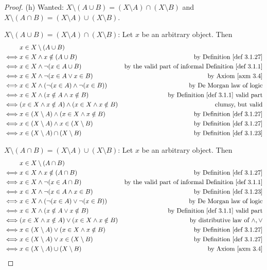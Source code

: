 \begin{proof}{(h)} Wanted: \(X \setminus (A \cup B) = (X \setminus A) \cap (X \setminus B) \) and \(X \setminus (A \cap B) = (X \setminus A) \cup (X \setminus B)\).

\(X \setminus (A \cup B) = (X \setminus A) \cap (X \setminus B) \): Let \(x\) be an arbitrary object. Then
\begin{align*}
         & x \in X \setminus (A \cup B) \\
    \iff & x \in X \land x \notin (A \cup B) & \text{by \DEF{3.1.27}} \\
    \iff & x \in X \land \lnot(x \in A \cup B) & \text{by the valid part of informal \DEF{3.1.1}} \\
    \iff & x \in X \land \lnot(x \in A \lor x \in B) & \text{by \AXM{3.4}} \\
    \iff & x \in X \land (\lnot(x \in A) \land \lnot(x \in B)) & \text{by De Morgan law of logic} \\
    \iff & x \in X \land (x \notin A \land x \notin B) & \text{by \DEF{3.1.1} valid part} \\
    \iff & (x \in X \land x \notin A) \land (x \in X \land x \notin B) & \text{clumsy, but valid} \\
    \iff & x \in (X \setminus A) \land (x \in X \land x \notin B) & \text{by \DEF{3.1.27}} \\
    \iff & x \in (X \setminus A) \land x \in (X \setminus B) & \text{by \DEF{3.1.27}} \\
    \iff & x \in (X \setminus A) \cap (X \setminus B) & \text{by \DEF{3.1.23}}
\end{align*}

\(X \setminus (A \cap B) = (X \setminus A) \cup (X \setminus B) \): Let \(x\) be an arbitrary object. Then
\begin{align*}
         & x \in X \setminus (A \cap B) \\
    \iff & x \in X \land x \notin (A \cap B) & \text{by \DEF{3.1.27}} \\
    \iff & x \in X \land \lnot(x \in A \cap B) & \text{by the valid part of informal \DEF{3.1.1}} \\
    \iff & x \in X \land \lnot(x \in A \land x \in B) & \text{by \DEF{3.1.23}} \\
    \iff & x \in X \land (\lnot(x \in A) \lor \lnot(x \in B)) & \text{by De Morgan law of logic} \\
    \iff & x \in X \land (x \notin A \lor x \notin B) & \text{by \DEF{3.1.1} valid part} \\
    \iff & (x \in X \land x \notin A) \lor (x \in X \land x \notin B) & \text{by distributive law of \(\land, \lor\)} \\
    \iff & x \in (X \setminus A) \lor (x \in X \land x \notin B) & \text{by \DEF{3.1.27}} \\
    \iff & x \in (X \setminus A) \lor x \in (X \setminus B) & \text{by \DEF{3.1.27}} \\
    \iff & x \in (X \setminus A) \cup (X \setminus B) & \text{by \AXM{3.4}}
\end{align*}
\end{proof}

